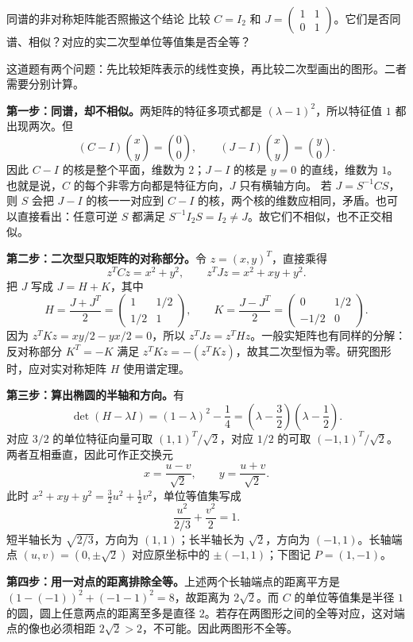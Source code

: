 \begin{example}{同谱的非对称矩阵能否照搬这个结论}
比较 $C=I_2$ 和 $J=\begin{pmatrix}1&1\\0&1\end{pmatrix}$。它们是否同谱、相似？对应的实二次型单位等值集是否全等？
\end{example}
\begin{solution}
这道题有两个问题：先比较矩阵表示的线性变换，再比较二次型画出的图形。二者需要分别计算。

\textbf{第一步：同谱，却不相似。}两矩阵的特征多项式都是 $(\lambda-1)^2$，所以特征值 $1$ 都出现两次。但
\[
(C-I)\binom{x}{y}=\binom00,\qquad
(J-I)\binom{x}{y}=\binom y0.
\]
因此 $C-I$ 的核是整个平面，维数为 $2$；$J-I$ 的核是 $y=0$ 的直线，维数为 $1$。也就是说，$C$ 的每个非零方向都是特征方向，$J$ 只有横轴方向。
若 $J=S^{-1}CS$，则 $S$ 会把 $J-I$ 的核一一对应到 $C-I$ 的核，两个核的维数应相同，矛盾。也可以直接看出：任意可逆 $S$ 都满足 $S^{-1}I_2S=I_2\ne J$。故它们不相似，也不正交相似。

\textbf{第二步：二次型只取矩阵的对称部分。}令 $z=(x,y)^T$，直接乘得
\[
z^TCz=x^2+y^2,\qquad z^TJz=x^2+xy+y^2.
\]
把 $J$ 写成 $J=H+K$，其中
\[
H=\frac{J+J^T}{2}=\begin{pmatrix}1&1/2\\1/2&1\end{pmatrix},\qquad
K=\frac{J-J^T}{2}=\begin{pmatrix}0&1/2\\-1/2&0\end{pmatrix}.
\]
因为 $z^TKz=xy/2-yx/2=0$，所以 $z^TJz=z^THz$。一般实矩阵也有同样的分解：反对称部分 $K^T=-K$ 满足 $z^TKz=-(z^TKz)$，故其二次型恒为零。研究图形时，应对实对称矩阵 $H$ 使用谱定理。

\textbf{第三步：算出椭圆的半轴和方向。}有
\[
\det(H-\lambda I)=(1-\lambda)^2-\frac14
=\left(\lambda-\frac32\right)\left(\lambda-\frac12\right).
\]
对应 $3/2$ 的单位特征向量可取 $(1,1)^T/\sqrt2$，对应 $1/2$ 的可取 $(-1,1)^T/\sqrt2$。两者互相垂直，因此可作正交换元
\[
x=\frac{u-v}{\sqrt2},\qquad y=\frac{u+v}{\sqrt2}.
\]
此时 $x^2+xy+y^2=\frac32u^2+\frac12v^2$，单位等值集写成
\[
\frac{u^2}{2/3}+\frac{v^2}{2}=1.
\]
短半轴长为 $\sqrt{2/3}$，方向为 $(1,1)$；长半轴长为 $\sqrt2$，方向为 $(-1,1)$。长轴端点 $(u,v)=(0,\pm\sqrt2)$ 对应原坐标中的 $\pm(-1,1)$；下图记 $P=(1,-1)$。

\textbf{第四步：用一对点的距离排除全等。}上述两个长轴端点的距离平方是 $(1-(-1))^2+(-1-1)^2=8$，故距离为 $2\sqrt2$。而 $C$ 的单位等值集是半径 $1$ 的圆，圆上任意两点的距离至多是直径 $2$。若存在两图形之间的全等对应，这对端点的像也必须相距 $2\sqrt2>2$，不可能。因此两图形不全等。


\end{solution}

